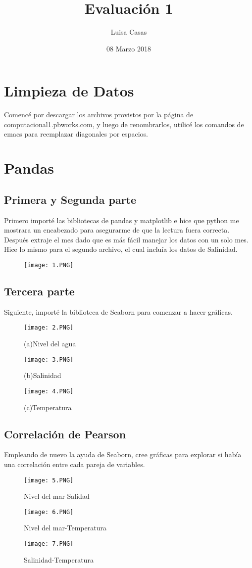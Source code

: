 \documentclass{article}
\title{Evaluación 1}
\author{Luisa Casas}
\date{08 Marzo 2018}
\begin{document}
\maketitle
\section{Limpieza de Datos}
Comencé por descargar los archivos provistos por la página de computacional1.pbworks.com, y luego de renombrarlos, utilicé los comandos de emacs para reemplazar diagonales por espacios.
\section{Pandas}
\subsection{Primera y Segunda parte}
Primero importé las bibliotecas de pandas y matplotlib e hice que python me mostrara un encabezado para asegurarme de que la lectura fuera correcta. Después extraje el mes dado que es más fácil manejar los datos con un solo mes.
\\Hice lo mismo para el segundo archivo, el cual incluía los datos de Salinidad.
\begin{figure}[H]
\texttt{[image: 1.PNG]}
\end{figure}
\subsection{Tercera parte}
Siguiente, importé la biblioteca de Seaborn para comenzar a hacer gráficas.
\begin{figure}[H]
\texttt{[image: 2.PNG]}
\caption{(a)Nivel del agua}
\end{figure}
\begin{figure}[H]
\texttt{[image: 3.PNG]}
\caption{(b)Salinidad}
\end{figure}
\begin{figure}[H]
\texttt{[image: 4.PNG]}
\caption{(c)Temperatura}
\end{figure}
\subsection{Correlación de Pearson}
Empleando de nuevo la ayuda de Seaborn, cree gráficas para explorar si había una correlación entre cada pareja de variables.
\begin{figure}[H]
\texttt{[image: 5.PNG]}
\caption{Nivel del mar-Salidad}
\end{figure}
\begin{figure}[H]
\texttt{[image: 6.PNG]}
\caption{Nivel del mar-Temperatura}
\end{figure}
\begin{figure}[H]
\texttt{[image: 7.PNG]}
\caption{Salinidad-Temperatura}
\end{figure}
\end{document}
